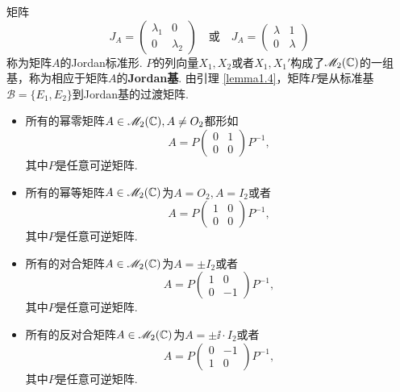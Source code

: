 \begin{mybox}
  \begin{remark}
    矩阵
    \[
      J_A = \begin{pmatrix}
        \lambda_1 & 0 \\
        0 & \lambda_2
      \end{pmatrix}\quad \text{或}\quad
      J_A = \begin{pmatrix}
        \lambda & 1 \\
        0 & \lambda
      \end{pmatrix}
    \]
    称为矩阵$A$的{\kaishu Jordan标准形}. $P$的列向量$X_1,X_2$或者$X_1,X_1'$构成了$\mathscr M_2(\mathbb C)$的一组基，称为相应于矩阵$A$的\textbf{Jordan基}. 由引理 \ref{lemma1.4}，矩阵$P$是从标准基$\mathscr B=\{E_1,E_2\}$到Jordan基的过渡矩阵.
  \end{remark}
\end{mybox}

\begin{mybox}
  \begin{corollary}[特殊矩阵的Jordan基的形式.]
    \begin{itemize}
      \item 所有的幂零矩阵$A\in\mathscr M_2(\mathbb C),A\ne O_2$都形如
          \[
            A = P \begin{pmatrix}
              0 & 1 \\
              0 & 0
            \end{pmatrix}P^{-1},
          \]
          其中$P$是任意可逆矩阵.
      \item 所有的幂等矩阵$A\in\mathscr M_2(\mathbb C)$为$A=O_2,A=I_2$或者
          \[
            A = P\begin{pmatrix}
              1 & 0 \\
              0 & 0
            \end{pmatrix}P^{-1},
          \]
          其中$P$是任意可逆矩阵.
      \item 所有的对合矩阵$A\in\mathscr M_2(\mathbb C)$为$A=\pm I_2$或者
          \[
            A = P\begin{pmatrix}
              1 & 0 \\
              0 & -1
            \end{pmatrix}P^{-1},
          \]
          其中$P$是任意可逆矩阵.
      \item 所有的反对合矩阵$A\in\mathscr M_2(\mathbb C)$为$A=\pm\ii\cdot I_2$或者
          \[
            A = P\begin{pmatrix}
              0 & -1\\
              1 & 0
            \end{pmatrix}P^{-1},
          \]
          其中$P$是任意可逆矩阵.
    \end{itemize}
  \end{corollary}
\end{mybox}

